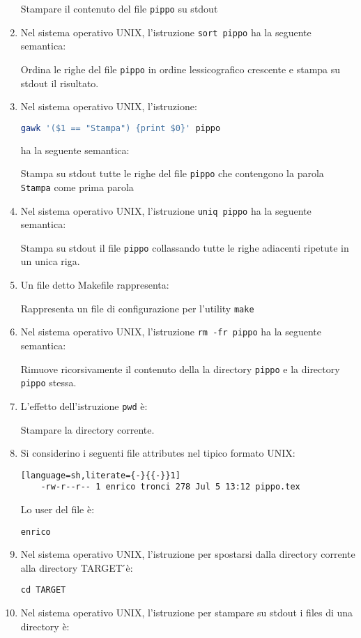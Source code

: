 \documentclass[a4paper,twoside]{article}
\newcommand{\code}[1]{\texttt{#1}}
\begin{document}
\begin{enumerate}
    Stampare il contenuto del file \code{pippo} su stdout
    \item Nel sistema operativo UNIX, l'istruzione \code{sort pippo} ha la seguente semantica: 

    Ordina le righe del file \code{pippo} in ordine lessicografico crescente e stampa su stdout il risultato. 
    \item Nel sistema operativo UNIX, l'istruzione:
    \begin{lstlisting}[language=sh]
    gawk '($1 == "Stampa") {print $0}' pippo 
    \end{lstlisting}
    ha la seguente semantica: 

    Stampa su stdout tutte le righe del file \code{pippo} che contengono la parola \code{Stampa} come prima parola
    \item Nel sistema operativo UNIX, l'istruzione \code{uniq pippo} ha la seguente semantica: 

    Stampa su stdout il file \code{pippo} collassando tutte le righe adiacenti ripetute in un unica riga. 
    \item Un file detto Makefile rappresenta:

    Rappresenta un file di configurazione per l'utility \code{make}
    \item Nel sistema operativo UNIX, l'istruzione \code{rm -fr pippo} ha la seguente semantica: 

    Rimuove ricorsivamente il contenuto della la directory \code{pippo} e la directory \code{pippo} stessa. 
    \item L'effetto dell'istruzione \code{pwd} \`e: 

    Stampare la directory corrente. 

    \item Si considerino i seguenti file attributes nel tipico formato UNIX:
    \begin{lstlisting}[language=sh,literate={-}{{-}}1]
    -rw-r--r-- 1 enrico tronci 278 Jul 5 13:12 pippo.tex
    \end{lstlisting}
    Lo user del file \`e: 

    \code{enrico}
    \item Nel sistema operativo UNIX, l'istruzione per spostarsi dalla directory corrente alla directory TARGET ́\`e:

    \code{cd TARGET}
    \item Nel sistema operativo UNIX, l'istruzione per stampare su stdout i files di una directory \`e: 


\end{enumerate}
\end{document}
